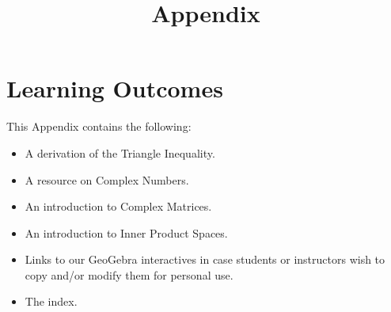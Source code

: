\documentclass{ximera}
\title{Appendix}
\begin{document}
\begin{abstract}

\end{abstract}
 
\maketitle

\section*{Learning Outcomes}
This Appendix contains the following:
 
\begin{itemize}
    \item A derivation of the Triangle Inequality.
    \item A resource on Complex Numbers.
    \item An introduction to Complex Matrices.
    \item An introduction to Inner Product Spaces.
    \item Links to our GeoGebra interactives in case students or instructors wish to copy and/or modify them for personal use.
    \item The index.  
\end{itemize}

 
\end{document}

